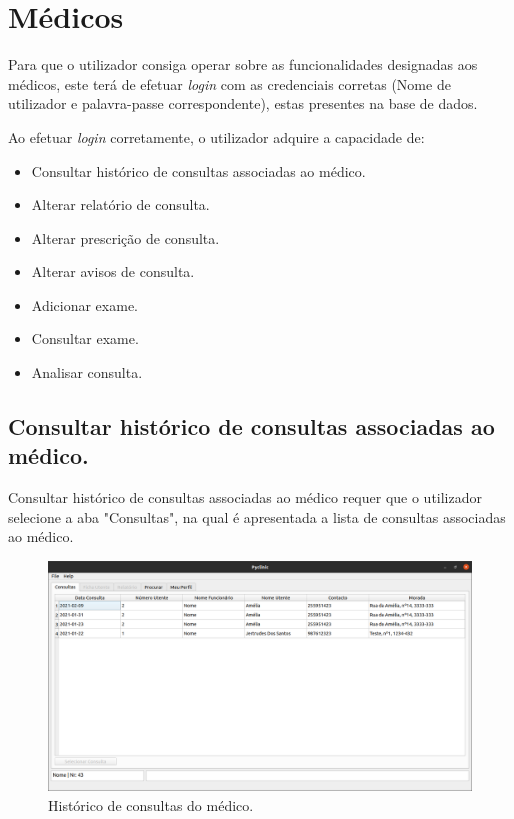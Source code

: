 \documentclass[11pt,a4paper,twoside]{article}
\begin{document}
\section{Médicos}     

Para que o utilizador consiga operar sobre as funcionalidades designadas aos médicos, este terá de efetuar \textit{login} com as credenciais corretas (Nome de utilizador e palavra-passe correspondente), estas presentes na base de dados.

Ao efetuar \textit{login} corretamente, o utilizador adquire a capacidade de:

\begin{itemize}
	\item Consultar histórico de consultas associadas ao médico.
	\item Alterar relatório de consulta.
	\item Alterar prescrição de consulta.
	\item Alterar avisos de consulta.
	\item Adicionar exame.
	\item Consultar exame.
	\item Analisar consulta.
\end{itemize}

\subsection{Consultar histórico de consultas associadas ao médico.}
Consultar histórico de consultas associadas ao médico requer que o utilizador selecione a aba "Consultas", na qual é apresentada a lista de consultas associadas ao médico.

\begin{figure}[H]
	\centering
	\includegraphics[width=0.9\linewidth]{image/medico/historicoConsultasMedico.png}
	\caption{Histórico de consultas do médico.}
	\label{fig:historicomedico}
\end{figure}
\end{document}
